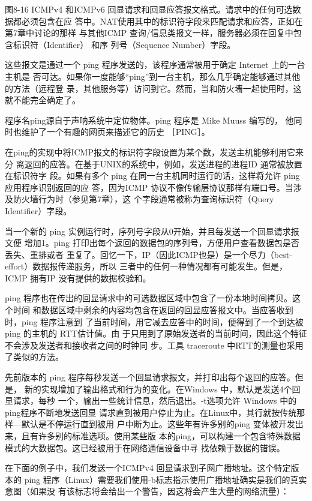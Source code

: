 图8-16 ICMPv4 和ICMPv6 回显请求和回显应答报文格式。请求中的任何可选数据都必须包含在应
答中。NAT使用其中的标识符字段来匹配请求和应答，正如在第7章中讨论的那样
与其他ICMP 查询/信息类报文一样，服务器必须在回复中包含标识符（Identifier） 和序
列号（Sequence Number）字段。

这些报文是通过一个 ping 程序发送的，该程序通常被用于确定 Internet 上的一台主机是
否可达。如果你一度能够“ping”到一台主机，那么几乎确定能够通过其他的方法（远程登
录，其他服务等）访问到它。然而，当和防火墻一起使用时，这就不能完全确定了。

\begin{tcolorbox}
	程序名ping源自于声呐系统中定位物体。ping 程序是 Mike Muuss 编写的，
	他同时也维护了一个有趣的网页来描述它的历史 ［PING］。
\end{tcolorbox}

在ping的实现中将ICMP报文的标识符字段设置为某个数，发送主机能够利用它来分
离返回的应答。在基于UNIX的系统中，例如，发送进程的进程ID 通常被放置在标识符字
段。如果有多个 ping 在同一台主机同时运行的话，这样将允许 ping 应用程序识别返回的应
答，因为ICMP 协议不像传输层协议那样有端口号。当涉及防火墙行为时（参见第7章），这
个字段通常被称为查询标识符（Query Identifier）字段。

当一个新的 ping 实例运行时，序列号字段从0开始，并且每发送一个回显请求报文便
增加1。ping 打印出每个返回的数据包的序列号，方便用户查看数据包是否丢失、重排或者
重复了。回忆一下，IP（因此ICMP也是）是一个尽力（best-effort）数据报传递服务，所以
三者中的任何一种情况都有可能发生。但是，ICMP 拥有IP 没有提供的数据校验和。

ping 程序也在传出的回显请求中的可选数据区域中包含了一份本地时间拷贝。这个时间
和数据区域中剩余的内容均包含在返回的回显应答报文中。当应答收到时，ping 程序注意到
了当前时间，用它减去应答中的时间，便得到了一个到达被 ping 的主机的 RTT估计值。由
于只用到了原始发送者的当前时间，因此这个特征不会涉及发送者和接收者之间的时钟同
步。工具 traceroute 中RTT的测量也采用了类似的方法。

先前版本的 ping 程序每秒发送一个回显请求报文，并打印出每个返回的应答。但是，
新的实现增加了输出格式和行为的变化。在Windows 中，默认是发送4个回显请求，每秒
一个，输出一些统计信息，然后退出。-t选项允许 Windows 中的ping程序不断地发送回显
请求直到被用户停止为止。在Linux中，其行就按传统那样—默认是不停运行直到被用
户中断为止。这些年有许多别的ping 变体被开发出来，且有许多别的标准选项。使用某些版
本的ping，可以构建一个包含特殊数据模式的大数据包。这已经被用于在网络通信设备中寻
找依赖于数据的错误。

在下面的例子中，我们发送一个ICMPv4 回显请求到子网广播地址。这个特定版本的
ping 程序（Linux）需要我们使用-b标志指示使用广播地址确实是我们的真实意图（如果没
有该标志将会给出一个警告，因这将会产生大量的网络流量）：

